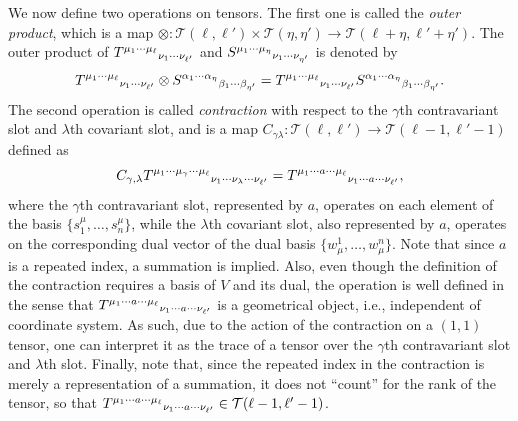 \documentclass[
12pt,		%
openright,	%
twoside,  %
a4paper,			%
chapter=TITLE,		%
english,			%
french,				%
spanish,			%
brazil				%
]{USPSC-classe/USPSC}
\begin{document}
\begin{apendicesenv}
We now define two operations on tensors. The first one is called the \textit{outer product}, which is a map $\otimes:\mathcal{T}(\ell,\ell')\times\mathcal{T}(\eta,\eta')\to\mathcal{T}(\ell+\eta,\ell'+\eta')$. The outer product of $T^{\mu_1\cdots\mu_{\ell}}\mathstrut_{\nu_1\cdots\nu_{\ell'}}$ and $S^{\mu_1\cdots\mu_{\eta}}\mathstrut_{\nu_1\cdots\nu_{\eta'}}$ is denoted by
\begin{equation}
    T^{\mu_1\cdots\mu_{\ell}}\mathstrut_{\nu_1\cdots\nu_{\ell'}}\otimes S^{\alpha_1\cdots\alpha_{\eta}}\mathstrut_{\beta_1\cdots\beta_{\eta'}}=T^{\mu_1\cdots\mu_{\ell}}\mathstrut_{\nu_1\cdots\nu_{\ell'}}S^{\alpha_1\cdots\alpha_{\eta}}\mathstrut_{\beta_1\cdots\beta_{\eta'}}.
\end{equation}
The second operation is called \textit{contraction} with respect to the $\gamma$th contravariant slot and $\lambda$th covariant slot, and is a map $C_{\gamma\lambda}:\mathcal{T}(\ell,\ell')\to\mathcal{T}(\ell-1,\ell'-1)$ defined as
\begin{equation}
    C_{\gamma,\lambda}T^{\mu_1\cdots \mu_{\gamma}\cdots\mu_{\ell}}\mathstrut_{\nu_1\cdots \nu_{\lambda}\cdots\nu_{\ell'}}=T^{\mu_1\cdots a\cdots\mu_{\ell}}\mathstrut_{\nu_1\cdots a\cdots\nu_{\ell'}},
\end{equation}
where the $\gamma$th contravariant slot, represented by $a$, operates on each element of the basis $\{s_1^{\mu},\ldots,s_n^{\mu}\}$, while the $\lambda$th covariant slot, also represented by $a$, operates on the corresponding dual vector of the dual basis $\{w^1_{\mu},\ldots,w^n_{\mu}\}$. Note that since $a$ is a repeated index, a summation is implied. Also, even though the definition of the contraction requires a basis of $V$ and its dual, the operation is well defined in the sense that $T^{\mu_1\cdots a\cdots\mu_{\ell}}\mathstrut_{\nu_1\cdots a\cdots\nu_{\ell'}}$ is a geometrical object, i.e., independent of coordinate system. As such, due to the action of the contraction on a $(1,1)$ tensor, one can interpret it as the trace of a tensor over the $\gamma$th contravariant slot and $\lambda$th slot. Finally, note that, since the repeated index in the contraction is merely a representation of a summation, it does not “count” for the rank of the tensor, so that $T^{\mu_1\cdots a\cdots\mu_{\ell}}\mathstrut_{\nu_1\cdots a\cdots\nu_{\ell'}}\in\mathcal{T}(\ell-1,\ell'-1)$. 


\end{apendicesenv}
\end{document}
